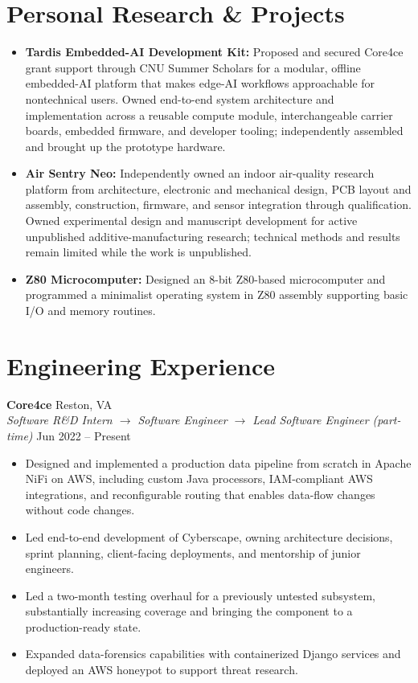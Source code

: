 \documentclass[10pt]{article}
\begin{document}
\section*{Personal Research \& Projects}
\begin{itemize}
  \item \textbf{Tardis Embedded-AI Development Kit:} Proposed and secured
  Core4ce grant support through CNU Summer Scholars for a modular, offline
  embedded-AI platform that makes edge-AI workflows approachable for
  nontechnical users. Owned end-to-end system architecture and implementation
  across a reusable compute module, interchangeable carrier boards, embedded
  firmware, and developer tooling; independently assembled and brought up the
  prototype hardware.

  \item \textbf{Air Sentry Neo:} Independently owned an indoor air-quality
  research platform from architecture, electronic and mechanical design, PCB
  layout and assembly, construction, firmware, and sensor integration through
  qualification. Owned experimental design and manuscript development for
  active unpublished additive-manufacturing research; technical methods and
  results remain limited while the work is unpublished.

  \item \textbf{Z80 Microcomputer:} Designed an 8-bit Z80-based microcomputer
  and programmed a minimalist operating system in Z80 assembly supporting basic
  I/O and memory routines.
\end{itemize}

\section*{Engineering Experience}
\textbf{Core4ce} \hfill Reston, VA\\
\emph{Software R\&D Intern $\to$ Software Engineer $\to$ Lead Software Engineer
(part-time)} \hfill Jun 2022 -- Present
\begin{itemize}
  \item Designed and implemented a production data pipeline from scratch in
  Apache NiFi on AWS, including custom Java processors, IAM-compliant AWS
  integrations, and reconfigurable routing that enables data-flow changes
  without code changes.
  \item Led end-to-end development of Cyberscape, owning architecture decisions,
  sprint planning, client-facing deployments, and mentorship of junior
  engineers.
  \item Led a two-month testing overhaul for a previously untested subsystem,
  substantially increasing coverage and bringing the component to a
  production-ready state.
  \item Expanded data-forensics capabilities with containerized Django services
  and deployed an AWS honeypot to support threat research.
\end{itemize}
\end{document}
